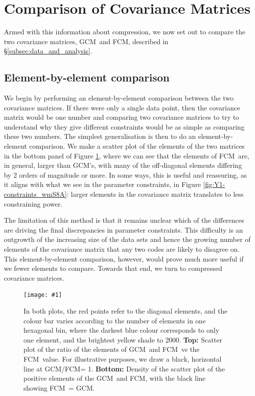 \documentclass[twocolumn]{\docclass}
\newcommand{\sfig}[2]{
	\texttt{[image: \#1]}
}
\newcommand{\Sfig}[2]{
	\begin{figure}[thbp]
		\sfig{../figures/#1.pdf}{\columnwidth}
		\caption{{\small #2}}
		\label{fig:#1}
	\end{figure}
}
\newcommand{\rf}[1]{Figure \ref{fig:#1}}
\newcommand{\rssec}[1]{\S\ref{subsec:#1}}
\newcommand\full{FCM}
\newcommand\gaussian{GCM}
\begin{document}
	\section{Comparison of Covariance Matrices}
	\label{sec:comparison_matrices}
	
	Armed with this information about compression, we now set out to compare the two covariance matrices, \gaussian\ and \full, described in \rssec{data_and_analysis}. 
	
	\subsection{Element-by-element comparison}
	\label{subsec:compare_one-one}
	
	We begin by performing an element-by-element comparison between the two covariance matrices. If there were only a single data point, then the covariance matrix would be one number and comparing two covariance matrices to try to understand why they give different constraints would be as simple as comparing these two numbers.  The simplest generalisation is then to do an element-by-element comparison. We make a scatter plot of the elements of the two matrices in the bottom panel of \rf{Y1-scatter}, where we can see that the elements of \full\ are, in general, larger than \gaussian's, with many of the off-diagonal elements differing by 2 orders of magnitude or more.
	In some ways, this is useful and reassuring, as it aligns with what we see in the parameter constraints, in \rf{Y1-constraints_wmS8A}: larger elements in the covariance matrix translates to less constraining power. 
	
	The limitation of this method is that it remains unclear which of the differences are driving the final discrepancies in parameter constraints. This difficulty is an outgrowth of the increasing size of the data sets and hence the growing number of elements of the covariance matrix that any two codes are likely to disagree on. This element-by-element comparison, however, would prove much more useful if we fewer elements to compare. Towards that end, we turn to compressed covariance matrices.
	
	\Sfig{Y1-scatter}{In both plots, the red points refer to the diagonal elements, and the colour bar varies according to the number of elements in one hexagonal bin, where the darkest blue colour corresponds to only one element, and the brightest yellow shade to 2000. \textbf{Top:} Scatter plot of the ratio of the elements of \gaussian\ and \full\ vs the \full\ value. For illustrative purposes, we draw a black, horizontal line at \gaussian/\full = 1. \textbf{Bottom:} Density of the scatter plot of the positive elements of the \gaussian\ and \full, with the black line showing \full\ = \gaussian.}
	
\end{document}
